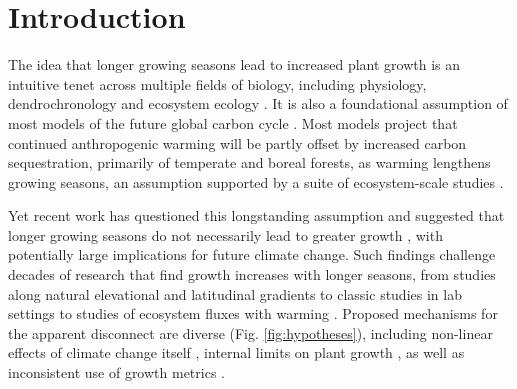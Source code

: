 \documentclass[11pt]{article}
\begin{document}
\section*{Introduction} %

The idea that longer growing seasons lead to increased plant growth is an intuitive tenet across multiple fields of biology, including physiology, dendrochronology and ecosystem ecology \citep{nobel1983biophysical,frank2022dendrochronology}. It is also a foundational assumption of most models of the future global carbon cycle \citep[e.g.][]{friedlingstein2022global, ito2020global}. Most models project that continued anthropogenic warming will be partly offset by increased carbon sequestration, primarily of temperate and boreal forests, as warming lengthens growing seasons, an assumption supported by a suite of ecosystem-scale studies \citep{chen1999effects,keenan2014net,finzi2020}. 

Yet recent work has questioned this longstanding assumption and suggested that longer growing seasons do not necessarily lead to greater growth \citep[e.g.][]{dow2022warm,green2022limits,silvestro2023longer}, with potentially large implications for future climate change. %
Such findings challenge decades of research that find growth increases with longer seasons, from studies along natural elevational and latitudinal gradients \citep[][]{myneni1997increased,berdanier2011growing,king2013tree,cuapio2022there} to classic studies in lab settings \citep{went1957experimental} to studies of ecosystem fluxes with warming \citep{chen1999effects,keenan2014net,finzi2020}. Proposed mechanisms for the apparent disconnect are diverse (Fig. \ref{fig:hypotheses}), including non-linear effects of climate change itself \citep[e.g., drought or heat strees][]{dow2022warm}, internal limits on plant growth  \citep{zohner2023effect}, as well as inconsistent use of growth metrics \citep{green2022limits}.
\end{document}
